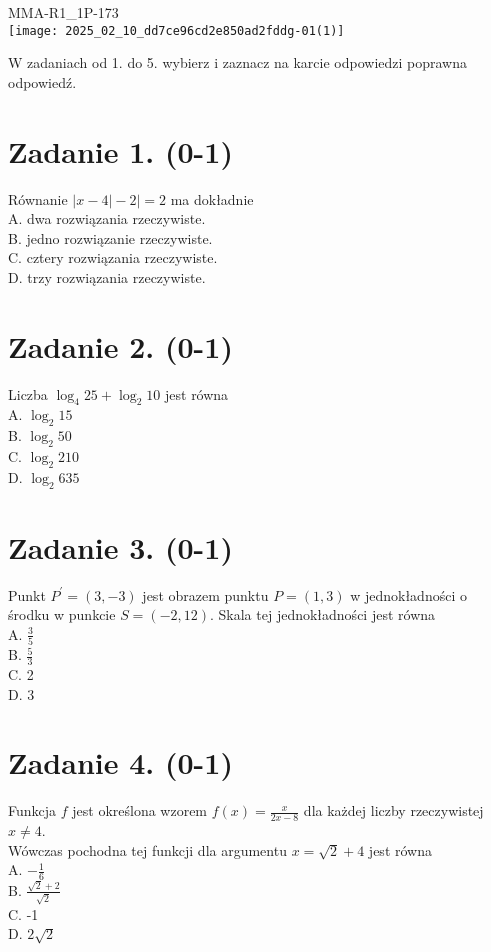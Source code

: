 \documentclass[10pt]{article}
\begin{document}
MMA-R1\_1P-173\\
\texttt{[image: 2025\_02\_10\_dd7ce96cd2e850ad2fddg-01(1)]}

W zadaniach od 1. do 5. wybierz i zaznacz na karcie odpowiedzi poprawna odpowiedź.

\section*{Zadanie 1. (0-1)}
Równanie \(|x-4|-2 \mid=2\) ma dokładnie\\
A. dwa rozwiązania rzeczywiste.\\
B. jedno rozwiązanie rzeczywiste.\\
C. cztery rozwiązania rzeczywiste.\\
D. trzy rozwiązania rzeczywiste.

\section*{Zadanie 2. (0-1)}
Liczba \(\log _{4} 25+\log _{2} 10\) jest równa\\
A. \(\log _{2} 15\)\\
B. \(\log _{2} 50\)\\
C. \(\log _{2} 210\)\\
D. \(\log _{2} 635\)

\section*{Zadanie 3. (0-1)}
Punkt \(P^{\prime}=(3,-3)\) jest obrazem punktu \(P=(1,3)\) w jednokładności o środku w punkcie \(S=(-2,12)\). Skala tej jednokładności jest równa\\
A. \(\frac{3}{5}\)\\
B. \(\frac{5}{3}\)\\
C. 2\\
D. 3

\section*{Zadanie 4. (0-1)}
Funkcja \(f\) jest określona wzorem \(f(x)=\frac{x}{2 x-8}\) dla każdej liczby rzeczywistej \(x \neq 4\).\\
Wówczas pochodna tej funkcji dla argumentu \(x=\sqrt{2}+4\) jest równa\\
A. \(-\frac{1}{6}\)\\
B. \(\frac{\sqrt{2}+2}{\sqrt{2}}\)\\
C. -1\\
D. \(2 \sqrt{2}\)
\end{document}
